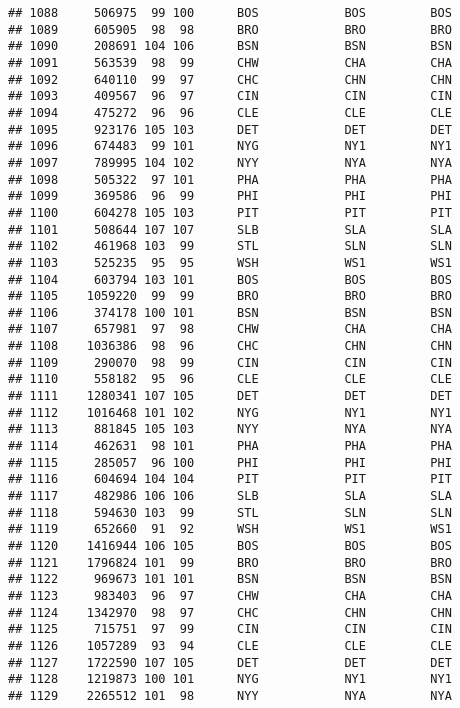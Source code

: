 \documentclass[]{article}
\begin{document}
\begin{verbatim}
## 1088     506975  99 100      BOS            BOS         BOS
## 1089     605905  98  98      BRO            BRO         BRO
## 1090     208691 104 106      BSN            BSN         BSN
## 1091     563539  98  99      CHW            CHA         CHA
## 1092     640110  99  97      CHC            CHN         CHN
## 1093     409567  96  97      CIN            CIN         CIN
## 1094     475272  96  96      CLE            CLE         CLE
## 1095     923176 105 103      DET            DET         DET
## 1096     674483  99 101      NYG            NY1         NY1
## 1097     789995 104 102      NYY            NYA         NYA
## 1098     505322  97 101      PHA            PHA         PHA
## 1099     369586  96  99      PHI            PHI         PHI
## 1100     604278 105 103      PIT            PIT         PIT
## 1101     508644 107 107      SLB            SLA         SLA
## 1102     461968 103  99      STL            SLN         SLN
## 1103     525235  95  95      WSH            WS1         WS1
## 1104     603794 103 101      BOS            BOS         BOS
## 1105    1059220  99  99      BRO            BRO         BRO
## 1106     374178 100 101      BSN            BSN         BSN
## 1107     657981  97  98      CHW            CHA         CHA
## 1108    1036386  98  96      CHC            CHN         CHN
## 1109     290070  98  99      CIN            CIN         CIN
## 1110     558182  95  96      CLE            CLE         CLE
## 1111    1280341 107 105      DET            DET         DET
## 1112    1016468 101 102      NYG            NY1         NY1
## 1113     881845 105 103      NYY            NYA         NYA
## 1114     462631  98 101      PHA            PHA         PHA
## 1115     285057  96 100      PHI            PHI         PHI
## 1116     604694 104 104      PIT            PIT         PIT
## 1117     482986 106 106      SLB            SLA         SLA
## 1118     594630 103  99      STL            SLN         SLN
## 1119     652660  91  92      WSH            WS1         WS1
## 1120    1416944 106 105      BOS            BOS         BOS
## 1121    1796824 101  99      BRO            BRO         BRO
## 1122     969673 101 101      BSN            BSN         BSN
## 1123     983403  96  97      CHW            CHA         CHA
## 1124    1342970  98  97      CHC            CHN         CHN
## 1125     715751  97  99      CIN            CIN         CIN
## 1126    1057289  93  94      CLE            CLE         CLE
## 1127    1722590 107 105      DET            DET         DET
## 1128    1219873 100 101      NYG            NY1         NY1
## 1129    2265512 101  98      NYY            NYA         NYA

\end{verbatim}
\end{document}

